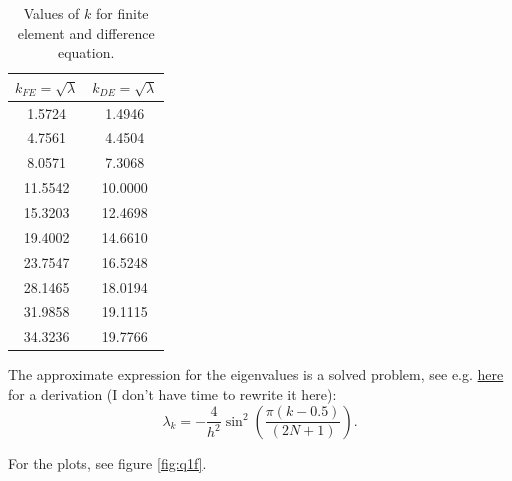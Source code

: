 \documentclass[letterpaper, reqno,11pt]{article}
\begin{document}
\begin{table}[h]
\centering
\begin{tabular}{|c|c|}
\hline
\textbf{$k_{FE}=\sqrt{\lambda}$} & \textbf{$k_{DE}=\sqrt{\lambda}$} \\
\hline
1.5724 & 1.4946 \\
4.7561 & 4.4504 \\
8.0571 & 7.3068 \\
11.5542 & 10.0000 \\
15.3203 & 12.4698 \\
19.4002 & 14.6610 \\
23.7547 & 16.5248 \\
28.1465 & 18.0194 \\
31.9858 & 19.1115 \\
34.3236 & 19.7766 \\
\hline
\end{tabular}
\caption{Values of $k$ for finite element and difference equation.}
\label{tab:q1f}
\end{table}

The approximate expression for the eigenvalues is a solved problem, see e.g. \href{https://en.wikipedia.org/wiki/Eigenvalues_and_eigenvectors_of_the_second_derivative#Dirichlet-Neumann_Case}{here} for a derivation (I don't have time to rewrite it here):
\[
\lambda_k=-\frac{4}{h^2}\sin^2\left( \frac{\pi(k-0.5)}{(2N+1)} \right) 
.\]

For the plots, see figure \ref{fig:q1f}.
\end{document}
